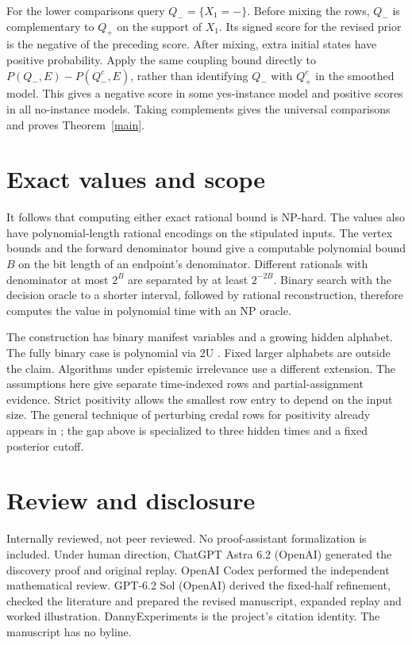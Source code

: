 \documentclass[11pt,a4paper]{amsart}
\begin{document}
For the lower comparisons query \(Q_-=\{X_1=-\}\).
Before mixing the rows, \(Q_-\) is complementary to \(Q_+\)
on the support of \(X_1\). Its signed score for the
revised prior is the negative of the preceding score.
After mixing, extra initial states have positive
probability. Apply the same coupling bound directly to
\(P(Q_-,E)-P(Q_-^c,E)\), rather than identifying \(Q_-\)
with \(Q_+^c\) in the smoothed model. This gives a
negative score in some yes-instance model and positive
scores in all no-instance models. Taking complements gives
the universal comparisons and proves Theorem~\ref{main}.

\newpage
\section{Exact values and scope}

It follows that computing either exact rational bound is
NP-hard. The values also have polynomial-length rational
encodings on the stipulated inputs. The vertex bounds and
the forward denominator bound give a computable polynomial
bound \(B\) on the bit length of an endpoint's denominator.
Different rationals with denominator at most \(2^B\) are
separated by at least \(2^{-2B}\). Binary search with the
decision oracle to a shorter interval, followed by rational
reconstruction, therefore computes the value in polynomial
time with an NP oracle.

The construction has binary manifest variables and a growing
hidden alphabet. The fully binary case is polynomial via 2U
\cite{twou}. Fixed larger alphabets are outside the claim.
Algorithms under epistemic irrelevance \cite{epi} use a
different extension. The assumptions here give separate
time-indexed rows and partial-assignment evidence. Strict
positivity allows the smallest row entry to depend on the
input size. The general technique of perturbing credal rows
for positivity already appears in \cite[Section~3.2]{maua};
the gap above is specialized to three hidden times and a
fixed posterior cutoff.

\section*{Review and disclosure}
Internally reviewed, not peer reviewed. No proof-assistant
formalization is included. Under human direction, ChatGPT Astra 6.2
(OpenAI) generated the discovery proof and original replay.
OpenAI Codex performed the independent mathematical review.
GPT-6.2 Sol (OpenAI) derived the fixed-half refinement, checked
the literature and prepared the revised manuscript, expanded replay
and worked illustration. DannyExperiments is the project's
citation identity. The manuscript has no byline.
\end{document}
